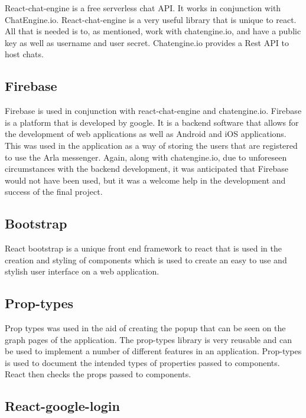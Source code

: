 React-chat-engine is a free serverless chat API. It works in conjunction with ChatEngine.io. React-chat-engine is a very useful library that is unique to react. All that is needed is to, as mentioned, work with chatengine.io, and have a public key as well as username and user secret. Chatengine.io provides a Rest API to host chats.\cite{Chatengine}\\

\subsection{Firebase}

Firebase is used in conjunction with react-chat-engine and chatengine.io. Firebase is a platform that is developed by google. It is a backend software that allows for the development of web applications as well as Android and iOS applications. This was used in the application as a way of storing the users that are registered to use the Arla messenger. Again, along with chatengine.io, due to unforeseen circumstances with the backend development, it was anticipated that Firebase would not have been used, but it was a welcome help in the development and success of the final project.\cite{Firebase} \\

\subsection{Bootstrap}

React bootstrap is a unique front end framework to react that is used in the creation and styling of components which is used to create an easy to use and stylish user interface on a web application.\cite{Bootstrap} \\

\subsection{Prop-types}

Prop types was used in the aid of creating the popup that can be seen on the graph pages of the application. The prop-types library is very reusable and can be used to implement a number of different features in an application. Prop-types is used to document the intended types of properties passed to components. React then checks the props passed to components.\cite{prop-types}\\

\subsection{React-google-login}

